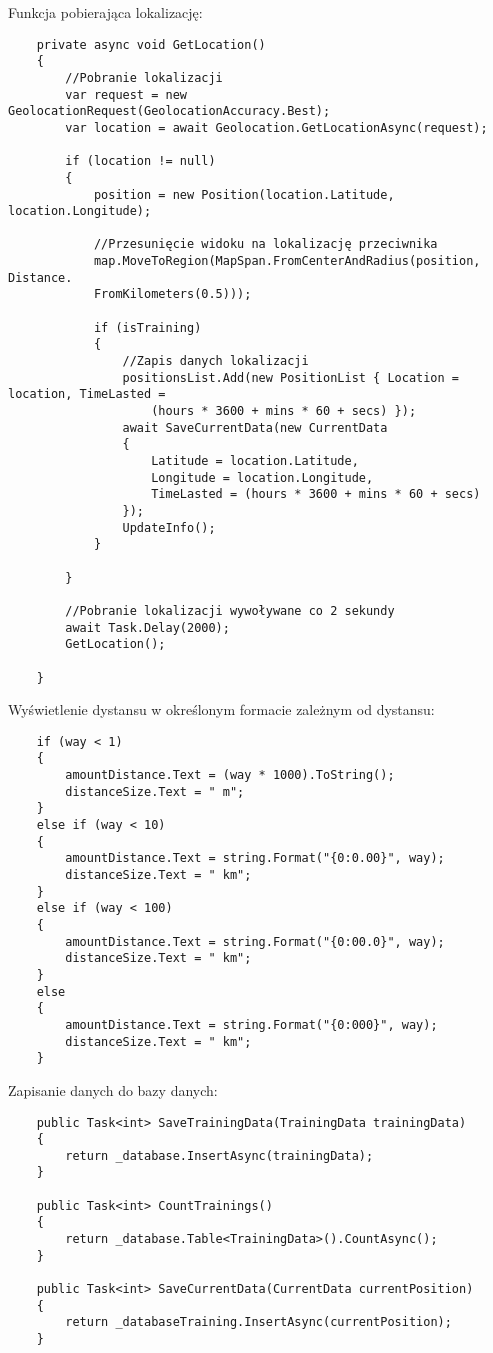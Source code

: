 \hspace{0.60cm}Funkcja pobierająca lokalizację:
\begin{verbatim}
	private async void GetLocation()
	{
		//Pobranie lokalizacji
		var request = new GeolocationRequest(GeolocationAccuracy.Best);
		var location = await Geolocation.GetLocationAsync(request);
		
		if (location != null)
		{
			position = new Position(location.Latitude, location.Longitude);
			
			//Przesunięcie widoku na lokalizację przeciwnika
			map.MoveToRegion(MapSpan.FromCenterAndRadius(position, Distance.
			FromKilometers(0.5)));
			
			if (isTraining)
			{   
				//Zapis danych lokalizacji
				positionsList.Add(new PositionList { Location = location, TimeLasted = 
					(hours * 3600 + mins * 60 + secs) });
				await SaveCurrentData(new CurrentData
				{
					Latitude = location.Latitude,
					Longitude = location.Longitude,
					TimeLasted = (hours * 3600 + mins * 60 + secs)
				});
				UpdateInfo();
			}
			
		}
		
		//Pobranie lokalizacji wywoływane co 2 sekundy
		await Task.Delay(2000);
		GetLocation();
		
	}
\end{verbatim}

\hspace{0.60cm}Wyświetlenie dystansu w określonym formacie zależnym od dystansu:
\begin{verbatim}
	if (way < 1)
	{
		amountDistance.Text = (way * 1000).ToString();
		distanceSize.Text = " m";
	}
	else if (way < 10)
	{
		amountDistance.Text = string.Format("{0:0.00}", way);
		distanceSize.Text = " km";
	}
	else if (way < 100)
	{
		amountDistance.Text = string.Format("{0:00.0}", way);
		distanceSize.Text = " km";
	}
	else
	{
		amountDistance.Text = string.Format("{0:000}", way);
		distanceSize.Text = " km";
	}
\end{verbatim}

\hspace{0.60cm}Zapisanie danych do bazy danych:
\begin{verbatim}
	public Task<int> SaveTrainingData(TrainingData trainingData)      
	{
		return _database.InsertAsync(trainingData);
	}
	
	public Task<int> CountTrainings()
	{
		return _database.Table<TrainingData>().CountAsync();
	}
	
	public Task<int> SaveCurrentData(CurrentData currentPosition)
	{
		return _databaseTraining.InsertAsync(currentPosition);
	}
\end{verbatim}
